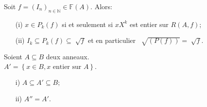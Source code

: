 \begin{maproposition}
	Soit $f=(I_n)_{n \in \mathbb{N}} \in \mathbb{F}(A)$. Alors:\\
	\begin{enumerate}
		\item[(i)] $x \in P_k(f)$ si et seulement si $xX^k$ est entier sur $R(A,f)$;
		\item[(ii)] $ I_k \subseteq P_k(f) \subseteq \sqrt[]{f}$ et en particulier $\ \sqrt[]{(P(f))} = \sqrt[]{f}$.
	\end{enumerate}
\end{maproposition}
\begin{maproposition}
	Soient $A \subseteq B$ deux anneaux.\\
	$A' =\left\{x \in B, x\text{ entier sur } A\right\}$.
	\begin{enumerate}
		\item[i)] $A \subseteq A' \subseteq B $;
		\item[ii)] $A'' = A'$.
	\end{enumerate}
\end{maproposition}
